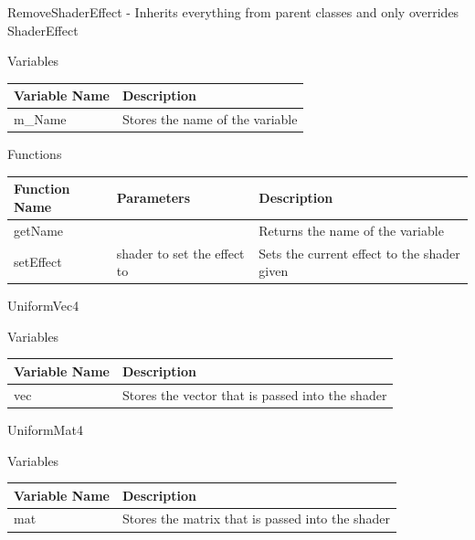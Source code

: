 \documentclass[../../Main.tex]{subfiles}
\begin{document}
    RemoveShaderEffect - Inherits everything from parent classes and only overrides \\
    ShaderEffect
    \begin{center}
        Variables
        \begin{tabular}{ | m{} | m{} | }
            \hline
            \textbf{Variable Name} & \textbf{Description} \\
            \hline
            m\_Name & Stores the name of the variable \\
            \hline
        \end{tabular}
        Functions
        \begin{tabular}{ | m{} | m{}| m{} | }
            \hline
            \textbf{Function Name} & \textbf{Parameters} & \textbf{Description} \\
            \hline
            getName & & Returns the name of the variable \\
            \hline
            setEffect & shader to set the effect to & Sets the current effect to the shader given \\
            \hline
        \end{tabular}
    \end{center}
    UniformVec4
    \begin{center}
        Variables
        \begin{tabular}{ | m{} | m{} | }
            \hline
            \textbf{Variable Name} & \textbf{Description} \\
            \hline
            vec & Stores the vector that is passed into the shader \\
            \hline
        \end{tabular}
    \end{center}
    UniformMat4
    \begin{center}
        Variables
        \begin{tabular}{ | m{} | m{} | }
            \hline
            \textbf{Variable Name} & \textbf{Description} \\
            \hline
            mat & Stores the matrix that is passed into the shader \\
            \hline
        \end{tabular}
    \end{center}
\end{document}
